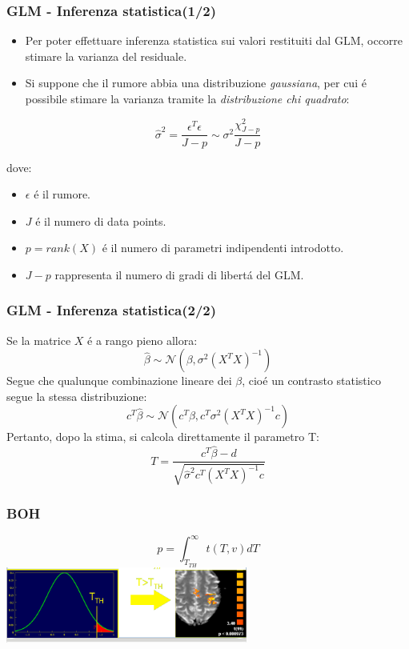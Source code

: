 \documentclass{beamer}
\begin{document}
\begin{frame}
\frametitle{GLM - Inferenza statistica(1/2)}

\begin{itemize}
\item Per poter effettuare inferenza statistica sui valori restituiti dal GLM, occorre stimare la \alert{varianza del residuale}.
\item Si suppone che il rumore abbia una distribuzione \emph{gaussiana}, per cui \'e possibile stimare la varianza tramite la \emph{distribuzione chi quadrato}:
\end{itemize}
 
$$\hat{\sigma}^2 = \frac{\epsilon^T\epsilon}{J - p} \sim \sigma^2 \frac{\chi^2_{J-p}}{J-p}$$

dove: 
\begin{itemize}
\item $\epsilon$ \'e il rumore.
\item $J$ \'e il numero di data points.
\item $p = rank(X) $ \'e il numero di parametri indipendenti introdotto.
\item $J-p$ rappresenta il numero di \alert{gradi di libert\'a} del GLM.
\end{itemize}
\end{frame}

\begin{frame}
\frametitle{GLM - Inferenza statistica(2/2)}
Se la matrice $X$ \'e a rango pieno allora:
$$\hat{\beta} \sim \mathcal{N}(\beta, \sigma^2(X^TX)^{-1})$$
Segue che qualunque combinazione lineare dei $\beta$, cio\'e un \alert{contrasto statistico} segue la stessa distribuzione:
$$c^T\hat{\beta} \sim \mathcal{N}(c^T\beta, c^T\sigma^2(X^TX)^{-1}c)$$
Pertanto, dopo la stima, si calcola direttamente il parametro T:
$$T = \frac{c^T\hat{\beta} - d}{\sqrt{\hat{\sigma}^2c^T(X^TX)^{-1}c}}$$
\end{frame}

\begin{frame}
\frametitle{BOH}
$$p = \int_{T_{TH}}^{\infty} t(T,v)dT$$
\includegraphics[keepaspectratio, width=300px]{Images/stats.png}
\end{frame}
\end{document}
